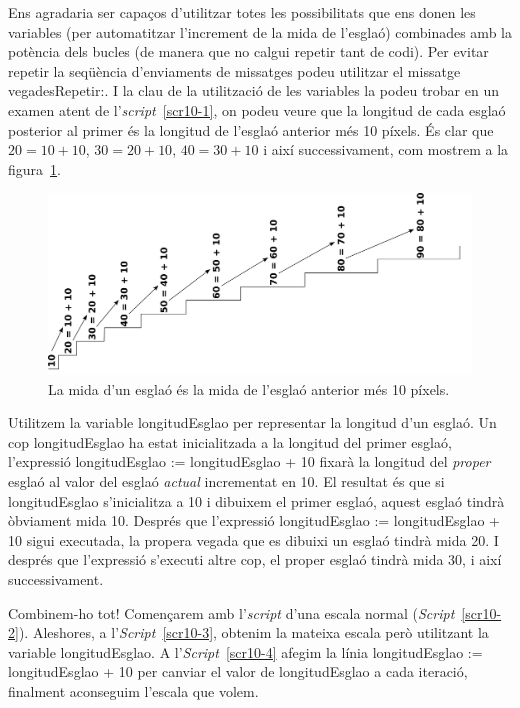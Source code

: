 Ens agradaria ser capaços d'utilitzar totes les possibilitats que ens donen les variables (per automatitzar l'increment de la mida de l'esglaó) combinades amb la potència dels bucles (de manera que no calgui repetir tant de codi). Per evitar repetir la seqüència d'enviaments de missatges podeu utilitzar el missatge \textsf{vegadesRepetir:}. I la clau de la utilització de les variables la podeu trobar en un examen atent de l'\emph{script}~\ref{scr10-1}, on podeu veure que la longitud de cada esglaó posterior al primer és la longitud de l'esglaó anterior més 10 píxels. És clar que $20=10+10$, $30=20+10$, $40=30+10$ i així successivament, com mostrem a la figura~\ref{fig1002}.  
\begin{figure}[h]
\begin{center}
\includegraphics[scale=0.1]{Imatges/figura10-2.pdf}
\end{center}
\caption{La mida d'un esglaó és la mida de l'esglaó anterior més 10 píxels.}
\label{fig1002}
\end{figure}

Utilitzem la variable \textsf{longitudEsglao} per representar la longitud d'un esglaó. Un cop \textsf{longitudEsglao} ha estat inicialitzada a la longitud del primer esglaó, l'expressió \textsf{longitudEsglao := longitudEsglao + 10} fixarà la longitud del \emph{proper} esglaó al valor del esglaó \emph{actual} incrementat en 10. El resultat és que si \textsf{longitudEsglao} s'inicialitza a 10 i dibuixem el primer esglaó, aquest esglaó tindrà òbviament mida 10. Després que l'expressió \textsf{longitudEsglao := longitudEsglao + 10} sigui executada, la propera vegada que es dibuixi un esglaó tindrà mida 20. I després que l'expressió s'executi altre cop, el proper esglaó tindrà mida 30, i així successivament.

Combinem-ho tot! Començarem amb l'\emph{script} d'una escala normal (\emph{Script}~\ref{scr10-2}). Aleshores, a l'\emph{Script}~\ref{scr10-3}, obtenim la mateixa escala però utilitzant la variable \textsf{longitudEsglao}. A l'\emph{Script}~\ref{scr10-4} afegim la línia \textsf{longitudEsglao := longitudEsglao + 10} per canviar el valor de \textsf{longitudEsglao} a cada iteració, finalment aconseguim l'escala que volem.

